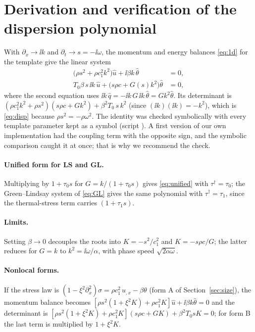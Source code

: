 \section{Derivation and verification of the dispersion polynomial}\label{app:disp}
With $\partial_x\to\ii k$ and $\partial_t\to s=-\ii\omega$, the momentum and energy balances \eqref{eq:1d} for the template give the linear system
\begin{align}
\bigl(\rho s^2+\rho c_1^2k^2\bigr)\hat u+\ii\beta k\,\hat\theta&=0,\\
T_0\beta\,s\,\ii k\,\hat u+\bigl(s\rho c+G(s)k^2\bigr)\hat\theta&=0,
\end{align}
where the second equation uses $\ii k\,\hat q=-\ii k\,G\,\ii k\,\hat\theta=Gk^2\hat\theta$. Its determinant is
$(\rho c_1^2k^2+\rho s^2)(s\rho c+Gk^2)+\beta^2T_0\,s\,k^2$ (since $(\ii k)(\ii k)=-k^2$), which is \eqref{eq:disp} because $\rho s^2=-\rho\omega^2$. The identity was checked symbolically with every template parameter kept as a symbol (script ). A first version of our own implementation had the coupling term with the opposite sign, and the symbolic comparison caught it at once; that is why we recommend the check.

\paragraph{Unified form for LS and GL.} Multiplying by $1+\tau_0s$ for $G=k/(1+\tau_0s)$ gives \eqref{eq:unified} with $\tau^\dagger=\tau_0$; the Green--Lindsay system of \eqref{eq:GL} gives the same polynomial with $\tau^\dagger=\tau_1$, since the thermal-stress term carries $(1+\tau_1s)$.

\paragraph{Limits.} Setting $\beta\to0$ decouples the roots into $K=-s^2/c_1^2$ and $K=-s\rho c/G$; the latter reduces for $G=k$ to $k^2=\ii\omega/\alpha$, with phase speed $\sqrt{2\alpha\omega}$.

\paragraph{Nonlocal forms.} If the stress law is $(1-\xi^2\partial_x^2)\sigma=\rho c_1^2\,u_{,x}-\beta\theta$ (form A of Section~\ref{sec:size}), the momentum balance becomes $[\rho s^2(1+\xi^2K)+\rho c_1^2K]\hat u+\ii\beta k\hat\theta=0$ and the determinant is $[\rho s^2(1+\xi^2K)+\rho c_1^2K](s\rho c+GK)+\beta^2T_0sK=0$; for form B the last term is multiplied by $1+\xi^2K$.
